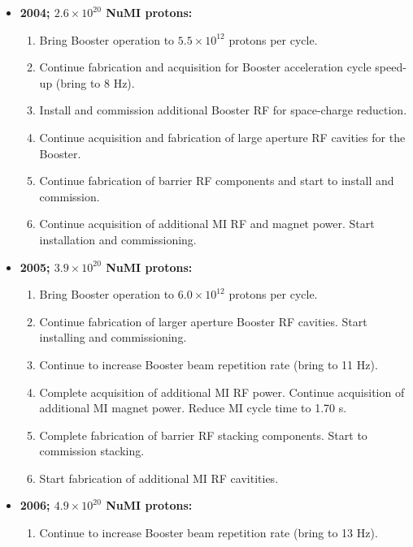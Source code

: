 \documentclass{article}
\begin{document}
\begin {itemize}
\begin {enumerate}
  \item Start design of MI collimators to eliminate internal and external
        radiation issues should adiabatic capture studies show these are
        needed. (Otherwise, don't do now.)
  \end {enumerate}
\item {\bf 2004; $2.6 \times 10^{20}$ NuMI protons:}
  \begin {enumerate}
  \item Bring Booster operation to $5.5 \times 10^{12}$ protons per cycle.
  \item Continue fabrication and acquisition for Booster acceleration cycle
        speed-up (bring to 8 Hz).
  \item Install and commission additional Booster RF for space-charge
        reduction.
  \item Continue acquisition and fabrication of large aperture RF cavities
        for the Booster.
  \item Continue fabrication of barrier RF components and start to install 
        and commission.
  \item Continue acquisition of additional MI RF and magnet power. 
        Start installation and commissioning.
  \end {enumerate}
\item {\bf 2005; $3.9 \times 10^{20}$ NuMI protons:}
   \begin {enumerate}
   \item Bring Booster operation to $6.0 \times 10^{12}$ protons per cycle.
   \item Continue fabrication of larger aperture Booster RF cavities. Start
         installing and commissioning.
   \item Continue to increase Booster beam repetition rate (bring to 11 Hz).
   \item Complete acquisition of additional MI RF power. Continue acquisition
      of additional MI magnet power. Reduce MI cycle time
      to 1.70 s.
   \item Complete fabrication of barrier RF stacking components. Start
      to commission stacking. 
   \item Start fabrication of additional MI RF cavitities.
   \end {enumerate}
\item {\bf 2006; $4.9 \times 10^{20}$ NuMI protons:}
   \begin {enumerate}
   \item Continue to increase Booster beam repetition rate (bring to 13 Hz).

\end{enumerate}
\end{itemize}
\end{document}
